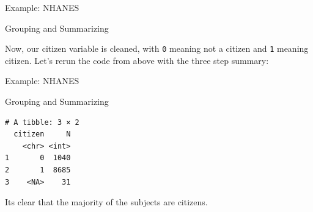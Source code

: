 \begin{frame}[fragile]{Example: NHANES}

\begin{block}{Grouping and Summarizing}

\begin{Shaded}
\begin{Highlighting}[]
\NormalTok{(}\NormalTok{)}
\end{Highlighting}
\end{Shaded}

\begin{Shaded}
\begin{Highlighting}[]
\OperatorTok{$}\StringTok{ }\OperatorTok{$}\NormalTok{)         }
\OperatorTok{$}\StringTok{ }\OperatorTok{$}\NormalTok{, }\NormalTok{)}
\end{Highlighting}
\end{Shaded}

Now, our citizen variable is cleaned, with \texttt{0} meaning not a
citizen and \texttt{1} meaning citizen. Let's rerun the code from above
with the three step summary:

\end{block}

\end{frame}

\begin{frame}[fragile]{Example: NHANES}

\begin{block}{Grouping and Summarizing}

\begin{Shaded}
\end{Shaded}

\begin{verbatim}
# A tibble: 3 × 2
  citizen     N
    <chr> <int>
1       0  1040
2       1  8685
3    <NA>    31
\end{verbatim}

Its clear that the majority of the subjects are citizens.

\end{block}

\end{frame}

